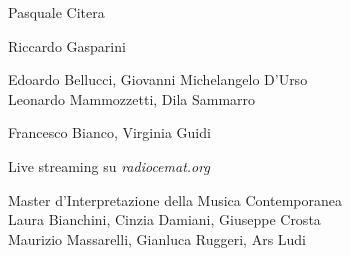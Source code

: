 \textbf{}

Pasquale Citera

\medskip




%

\medskip

\textbf{}

Riccardo Gasparini

\medskip

\textbf{}

Edoardo Bellucci, Giovanni Michelangelo D'Urso\\
Leonardo Mammozzetti, Dila Sammarro

\medskip

\textbf{}

Francesco Bianco, Virginia Guidi

\medskip

Live streaming su \emph{radiocemat.org}

\vfill

\textbf{}

Master d'Interpretazione della Musica Contemporanea\\
Laura Bianchini, Cinzia Damiani, Giuseppe Crosta\\
Maurizio Massarelli, Gianluca Ruggeri, Ars Ludi